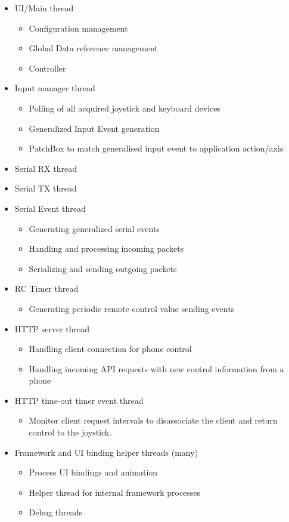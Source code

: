 \documentclass[final]{article}
\begin{document}
\begin{itemize}
    \item UI/Main thread
    \begin{itemize}
        \item Configuration management
        \item Global Data reference management
        \item Controller
    \end{itemize}
    \item Input manager thread
    \begin{itemize}
        \item Polling of all acquired joystick and keyboard devices
        \item Generalized Input Event generation
        \item PatchBox to match generalised input event to application action/axis
    \end{itemize}
    \item Serial RX thread
    \item Serial TX thread
    \item Serial Event thread
    \begin{itemize}
        \item Generating generalized serial events
        \item Handling and processing incoming packets
        \item Serializing and sending outgoing packets
    \end{itemize}
    \item RC Timer thread
    \begin{itemize}
        \item Generating periodic remote control value sending events
    \end{itemize}
    \item HTTP server thread
    \begin{itemize}
        \item Handling client connection for phone control
        \item Handling incoming API requests with new control information from a phone
    \end{itemize}
    \item HTTP time-out timer event thread
    \begin{itemize}
        \item Monitor client request intervals to disassociate the client and return control to the joystick.
    \end{itemize}
    \item Framework and UI binding helper threads (many)
        \begin{itemize}
        \item Process UI bindings and animation
        \item Helper thread for internal framework processes
        \item Debug threads
    \end{itemize}
\end{itemize}
\end{document}
